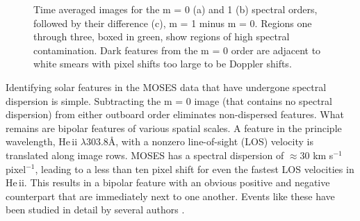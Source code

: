 \documentclass[]{solarphysics}
\begin{document}
\begin{article}
\begin{figure}
		

		
		\caption{Time averaged images for the m = 0 (a) and 1 (b) spectral orders, followed by their difference (c), m = 1 minus m = 0.  Regions one through three, boxed in green, show regions of high spectral contamination. Dark features from the m = 0 order are adjacent to white smears with pixel shifts too large to be Doppler shifts.}
		\label{fig:moses_super}
	\end{figure}

	

	Identifying solar features in the MOSES data that have undergone spectral dispersion is simple. Subtracting the m = 0 image (that contains no spectral dispersion) from either outboard order eliminates non-dispersed features. What remains are bipolar features of various spatial scales.  A feature in the principle wavelength, He\,{\sc ii} $\lambda 303.8$\AA, with a nonzero line-of-sight (LOS) velocity is translated along image rows.    MOSES has a spectral dispersion of $\approx 30$ km s$^{-1}$ pixel$^{-1}$, leading to a less than ten pixel shift for even the fastest LOS velocities in He\,{\sc ii}. This results in a bipolar feature with an obvious positive and negative counterpart that are immediately next to one another. Events like these have been studied in detail by several authors \citep{Fox2010,Rust2017,Courrier2018}.
	

\end{article}
\end{document}
